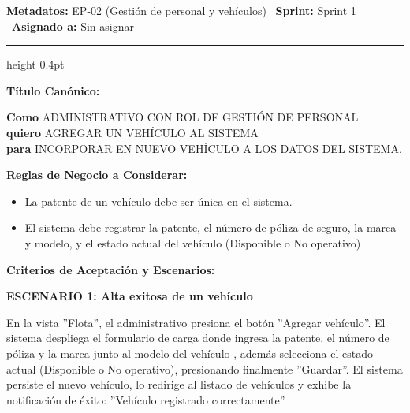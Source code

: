 \documentclass[a4paper,9pt]{article}
\begin{document}
\begin{tcolorbox}[hucard, title={\textbf{HU-9: AGREGAR VEHÍCULO} \hfill \scriptsize \colorbox{bluestatus}{\textbf{\ New\ }} \quad \colorbox{white}{\textcolor{primarydark}{\textbf{\ 2 pts\ }}}}]
\vspace{-1pt}
\noindent\textbf{\footnotesize Metadatos:} EP-02 (Gestión de personal y vehículos) \textbar\ \textbf{Sprint:} Sprint 1 \textbar\ \textbf{Asignado a:} Sin asignar\par\vspace{2pt}
\hrule height 0.4pt\par\vspace{3pt}
\noindent\textbf{\footnotesize Título Canónico:}\par\vspace{1pt}
{\small \textbf{Como} ADMINISTRATIVO CON ROL DE GESTIÓN DE PERSONAL \\ \textbf{quiero} AGREGAR UN VEHÍCULO AL SISTEMA \\ \textbf{para} INCORPORAR EN NUEVO VEHÍCULO A LOS DATOS DEL SISTEMA.}\par\vspace{3pt}
\noindent\textbf{\footnotesize Reglas de Negocio a Considerar:}\par\vspace{1pt}
{\footnotesize
\begin{itemize}[leftmargin=12pt, nosep, itemsep=1.5pt, topsep=1pt]
\item La patente de un vehículo debe ser única en el sistema.
\item El sistema debe registrar la patente, el número de póliza de seguro, la marca y modelo, y el estado actual del vehículo (Disponible o No operativo)
\end{itemize}
}\par\vspace{3pt}
\noindent\textbf{\footnotesize Criterios de Aceptación y Escenarios:}\par\vspace{2pt}
{\footnotesize
\noindent\textbf{\textcolor{secondarydark}{ESCENARIO 1:  Alta exitosa de un vehículo}}\par\vspace{1pt}
En la vista ''Flota'', el administrativo presiona el botón ''Agregar vehículo''. El sistema despliega el formulario de carga donde ingresa la patente, el número de póliza y la marca junto al modelo del vehículo , además selecciona el estado actual (Disponible o No operativo), presionando finalmente ''Guardar''. El sistema persiste el nuevo vehículo, lo redirige al listado de vehículos y exhibe la notificación de éxito: ''Vehículo registrado correctamente''.\par\vspace{2.5pt}
}
\end{tcolorbox}
\end{document}
